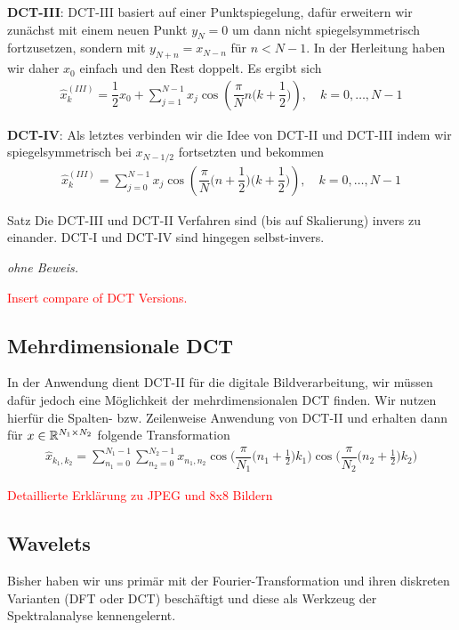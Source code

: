 \textbf{DCT-III}:
DCT-III basiert auf einer Punktspiegelung, dafür erweitern wir zunächst mit einem neuen Punkt $y_N=0$ um dann nicht 
spiegelsymmetrisch fortzusetzen, sondern mit $y_{N+n} = x_{N-n}$ für $n<N-1$. In der Herleitung haben wir daher 
$x_0$ einfach und den Rest doppelt. Es ergibt sich
%
\begin{align*}
  \hat{x}^{(III)}_k 
  = \dfrac{1}{2}x_0 + \sum_{j=1}^{N-1} x_j \cos\left(\dfrac{\pi}{N}n\Big(k+\dfrac{1}{2}\Big)\right), 
  \quad k=0,\dots,N-1
  \tag{III}\label{eq:DCTIIIeq}
\end{align*}
%

\textbf{DCT-IV}:
Als letztes verbinden wir die Idee von DCT-II und DCT-III indem wir spiegelsymmetrisch bei $x_{N-1/2}$ fortsetzten 
und bekommen
%
\begin{align*}
  \hat{x}^{(III)}_k 
  = \sum_{j=0}^{N-1} x_j \cos\left(\dfrac{\pi}{N}\Big(n+\dfrac{1}{2}\Big)\Big(k+\dfrac{1}{2}\Big)\right), 
  \quad k=0,\dots,N-1
  \tag{III}\label{eq:DCTIIIeq}
\end{align*}
%

\begin{colbox}{Satz}
  Die DCT-III und DCT-II Verfahren sind (bis auf Skalierung) invers zu einander. DCT-I und DCT-IV sind hingegen 
  selbst-invers.
\end{colbox}
\textit{ohne Beweis.}

\textcolor{red}{Insert compare of DCT Versions.}

\subsection{Mehrdimensionale DCT}
In der Anwendung dient DCT-II für die digitale Bildverarbeitung, wir müssen dafür jedoch eine Möglichkeit der 
mehrdimensionalen DCT finden. Wir nutzen hierfür die Spalten- bzw. Zeilenweise Anwendung von DCT-II und 
erhalten dann für $x\in\mathbb R^{N_1\times N_2}$ folgende Transformation
\begin{align*}
  \hat{x}_{k_1,k_2}
  = \sum_{n_1=0}^{N_1-1} \sum_{n_2=0}^{N_2-1}
  x_{n_1,n_2}
  \cos\Big(\dfrac{\pi}{N_1}\big(n_1+\tfrac{1}{2}\big)k_1\Big)
  \cos\Big(\dfrac{\pi}{N_2}\big(n_2+\tfrac{1}{2}\big)k_2\Big)
\end{align*}

\textcolor{red}{Detaillierte Erklärung zu JPEG und 8x8 Bildern}

\subsection{Wavelets}
Bisher haben wir uns primär mit der Fourier-Transformation und ihren diskreten Varianten (DFT oder DCT) beschäftigt 
und diese als Werkzeug der Spektralanalyse kennengelernt. 

